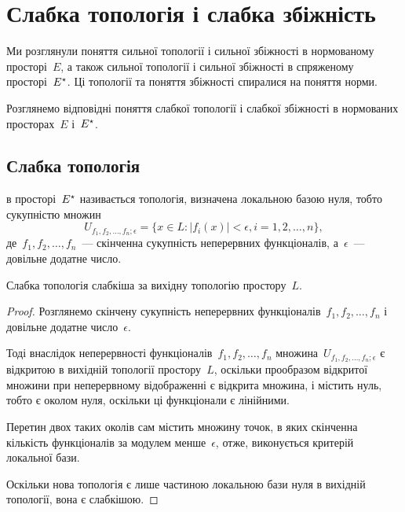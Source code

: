 \chapter{Слабка топологія і слабка збіжність}

Ми розглянули поняття сильної топології і сильної
збіжності в нормованому просторі~$E$, а також сильної
топології і сильної збіжності в спряженому просторі~$E^\star$.
Ці топології та поняття збіжності спиралися на поняття норми.

Розглянемо відповідні поняття слабкої топології і слабкої
збіжності в нормованих просторах~$E$ і~$E^\star$.

\section{Слабка топологія}

\begin{definition}
 в просторі~$E^\star$
називається топологія, визначена локальною базою нуля,
тобто сукупністю множин
\begin{equation*}
    U_{f_1, f_2, \dots, f_n; \epsilon} =
    \{ x \in L: |f_i(x)| < \epsilon, i = 1, 2, \dots, n\},
\end{equation*}
де~$f_1, f_2, \dots, f_n$~--- скінченна сукупність неперервних
функціоналів, а~$\epsilon$~--- довільне додатне число.
\end{definition}

\begin{lemma}
Слабка топологія слабкіша за вихідну топологію простору~$L$.
\end{lemma}

\begin{proof}
Розглянемо скінчену сукупність неперервних
функціоналів~$f_1, f_2, \dots, f_n$ і довільне додатне число~$\epsilon$.

Тоді внаслідок неперервності функціоналів~$f_1, f_2, \dots, f_n$
множина~$U_{f_1, f_2, \dots, f_n; \epsilon}$
є відкритою в вихідній топології простору~$L$,
оскільки прообразом відкритої множини
при неперервному відображенні є відкрита множина,
і містить нуль, тобто є околом нуля,
оскільки ці функціонали є лінійними.

Перетин двох таких околів сам містить множину точок,
в яких скінченна кількість функціоналів за модулем менше~$\epsilon$,
отже, виконується критерій локальної бази.

Оскільки нова топологія є лише частиною локальною бази нуля
в вихідній топології, вона є слабкішою. 
\end{proof}

